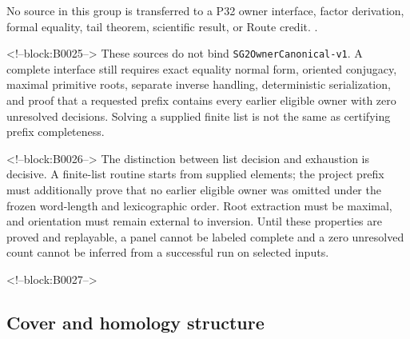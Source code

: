 \documentclass[11pt]{article}
\begin{document}
No source in this group is transferred to a P32 owner interface, factor derivation, formal equality, tail theorem, scientific result, or Route credit.
\citep{P32-S06}.

<!--block:B0025-->
These sources do not bind \texttt{SG2OwnerCanonical-v1}. A complete
interface still requires exact equality normal form, oriented conjugacy,
maximal primitive roots, separate inverse handling, deterministic
serialization, and proof that a requested prefix contains every earlier
eligible owner with zero unresolved decisions. Solving a supplied finite
list is not the same as certifying prefix completeness.

<!--block:B0026-->
The distinction between list decision and exhaustion is decisive. A
finite-list routine starts from supplied elements; the project prefix
must additionally prove that no earlier eligible owner was omitted
under the frozen word-length and lexicographic order. Root extraction
must be maximal, and orientation must remain external to inversion.
Until these properties are proved and replayable, a panel cannot be
labeled complete and a zero unresolved count cannot be inferred from a
successful run on selected inputs.

<!--block:B0027-->
\hypertarget{22-cover-and-homology-structure}{%
\subsection{Cover and homology
structure}\label{22-cover-and-homology-structure}}
\end{document}
